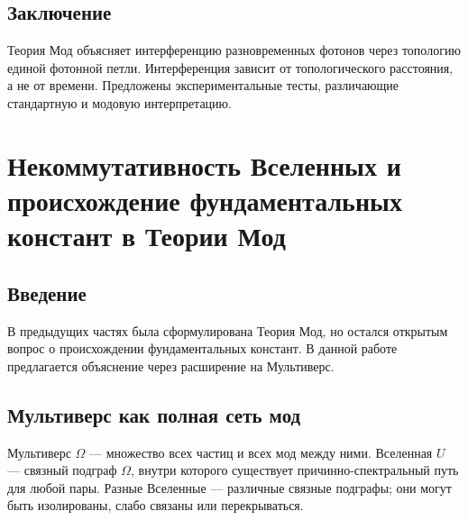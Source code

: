 \documentclass[12pt,a4paper]{article}
\begin{document}
\subsection{Заключение}
Теория Мод объясняет интерференцию разновременных фотонов через топологию единой фотонной петли. Интерференция зависит от топологического расстояния, а не от времени. Предложены экспериментальные тесты, различающие стандартную и модовую интерпретацию.

\newpage
\section{Некоммутативность Вселенных и происхождение фундаментальных констант в Теории Мод}

\begin{abstract}
В предыдущих частях была сформулирована Теория Мод, поставлена задача восстановления спектров и предложен численный алгоритм. Однако остался открытым вопрос: почему фундаментальные константы имеют именно такие значения? В данной работе предлагается объяснение, основанное на расширении Теории Мод на Мультиверс --- полную сеть всех частиц и мод, в которой наша Вселенная является лишь связным подграфом. Показано, что уравнения для спектров внутри одной Вселенной принципиально незамкнуты из-за наличия внешних связей с другими Вселенными. Наблюдаемые фундаментальные константы являются проекцией глобального решения для всего Мультиверса на нашу причинно-связанную область. Разные Вселенные могут иметь различные эффективные законы физики. Вводится понятие некоммутативности проекционных операторов для разных Вселенных.

\bigskip
\noindent\textbf{Ключевые слова:} Теория Мод, Мультиверс, некоммутативность, фундаментальные константы, тонкая настройка, космологическая постоянная.
\end{abstract}

\subsection{Введение}
В предыдущих частях была сформулирована Теория Мод, но остался открытым вопрос о происхождении фундаментальных констант. В данной работе предлагается объяснение через расширение на Мультиверс.

\subsection{Мультиверс как полная сеть мод}
Мультиверс $\Omega$ --- множество всех частиц и всех мод между ними. Вселенная $U$ --- связный подграф $\Omega$, внутри которого существует причинно-спектральный путь для любой пары. Разные Вселенные --- различные связные подграфы; они могут быть изолированы, слабо связаны или перекрываться.
\end{document}
